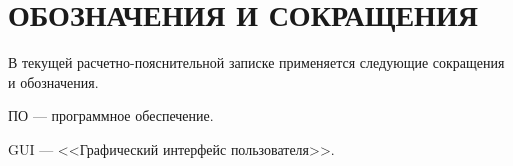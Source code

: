 \section*{\centering ОБОЗНАЧЕНИЯ И СОКРАЩЕНИЯ}

В текущей расчетно-пояснительной записке применяется следующие сокращения и обозначения.

\begin{description}[leftmargin=0pt]
	\item \noindent ПО --- программное обеспечение.
	\item \noindent GUI --- <<Графический интерфейс пользователя>>.
\end{description}

